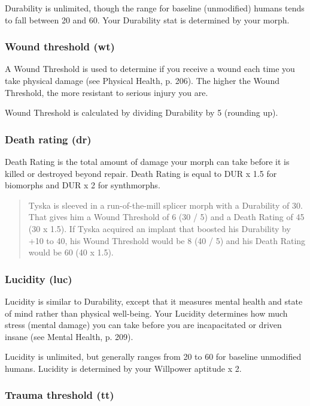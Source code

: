Durability is unlimited, though the range for baseline (unmodified) humans tends to fall between 20 and 60. Your Durability stat is determined by your morph.

\subsubsection{Wound threshold (wt)}
\label{sec:wound-threshold-wt}

A Wound Threshold is used to determine if you receive a wound each time you take physical damage (see Physical Health, p. 206). The higher the Wound Threshold, the more resistant to serious injury you are.

Wound Threshold is calculated by dividing Durability by 5 (rounding up).

\subsubsection{Death rating (dr)}
\label{sec:death-rating-dr}

Death Rating is the total amount of damage your morph can take before it is killed or destroyed beyond repair. Death Rating is equal to DUR x 1.5 for biomorphs and DUR x 2 for synthmorphs.

\begin{quotation}
Tyska is sleeved in a run-of-the-mill splicer morph with a Durability of 30. That gives him a Wound Threshold of 6 (30 / 5) and a Death Rating of 45 (30 x 1.5). If Tyska acquired an implant that boosted his Durability by +10 to 40, his Wound Threshold would be 8 (40 / 5) and his Death Rating would be 60 (40 x 1.5).
\end{quotation}

\subsubsection{Lucidity (luc)}
\label{sec:lucidity-luc}

Lucidity is similar to Durability, except that it measures mental health and state of mind rather than physical well-being. Your Lucidity determines how much stress (mental damage) you can take before you are incapacitated or driven insane (see Mental Health, p. 209).

Lucidity is unlimited, but generally ranges from 20 to 60 for baseline unmodified humans. Lucidity is determined by your Willpower aptitude x 2.

\subsubsection{Trauma threshold (tt)}
\label{sec:trauma-threshold-tt}

